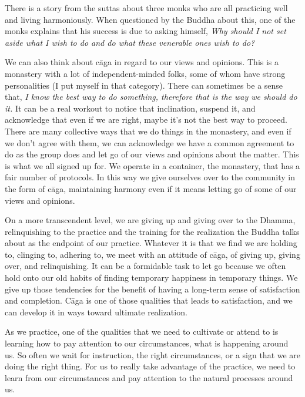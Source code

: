 There is a story from the suttas about three monks who are all 
practicing well and living harmoniously. When questioned by the Buddha 
about this, one of the monks explains that his success is due to asking 
himself, \emph{Why should I not set aside what I wish to do and do what 
these venerable ones wish to do?}

We can also think about cāga in regard to our views and opinions. This 
is a monastery with a lot of independent-minded folks, some of whom 
have strong personalities (I put myself in that category). There can 
sometimes be a sense that, \emph{I know the best way to do something, 
therefore that is the way we should do it.} It can be a real workout to 
notice that inclination, suspend it, and acknowledge that even if we 
are right, maybe it's not the best way to proceed. There are many 
collective ways that we do things in the monastery, and even if we 
don't agree with them, we can acknowledge we have a common agreement to 
do as the group does and let go of our views and opinions about the 
matter. This is what we all signed up for. We operate in a container, 
the monastery, that has a fair number of protocols. In this way we give 
ourselves over to the community in the form of cāga, maintaining 
harmony even if it means letting go of some of our views and opinions.

On a more transcendent level, we are giving up and giving over to the 
Dhamma, relinquishing to the practice and the training for the 
realization the Buddha talks about as the endpoint of our practice. 
Whatever it is that we find we are holding to, clinging to, adhering 
to, we meet with an attitude of cāga, of giving up, giving over, and 
relinquishing. It can be a formidable task to let go because we often 
hold onto our old habits of finding temporary happiness in temporary 
things. We give up those tendencies for the benefit of having a 
long-term sense of satisfaction and completion. Cāga is one of those 
qualities that leads to satisfaction, and we can develop it in ways 
toward ultimate realization.


As we practice, one of the qualities that we need to cultivate or 
attend to is learning how to pay attention to our circumstances, what 
is happening around us. So often we wait for instruction, the right 
circumstances, or a sign that we are doing the right thing. For us to 
really take advantage of the practice, we need to learn from our 
circumstances and pay attention to the natural processes around us.


